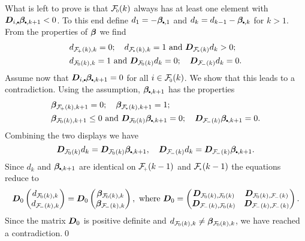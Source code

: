 \begin{subappendices}
What is left to prove is that $\Fset{0}(k)$ always has at least one element
with $\bfD_{i,\sbullet}\bfbeta_{\sbullet,k+1}<0$. To this end define
$d_1=-\bfbeta_{\sbullet,1}$ and $d_k=d_{k-1}-\bfbeta_{\sbullet,k}$ for $k>1$.
From the properties of $\bm{\beta}$ we find
\begin{align*}
 & d_{\Fset{+}(k),k}=0;\quad
 d_{\Fset{*}(k),k}=1\ \text{and}\ \bfD_{\Fset{*}(k)}d_k>0;
 \\ &
 d_{\Fset{0}(k),k}=1\ \text{and}\ \bfD_{\Fset{0}(k)}d_k=0;
 \quad
 \bfD_{\Fset{-}(k)}d_k=0.
\end{align*}
Assume now that $\bfD_{i,\sbullet}\bfbeta_{\sbullet,k+1}=0$ for all
$i\in \Fset{0}(k)$. We show that this leads to a contradiction.
Using the assumption, $\bfbeta_{\sbullet,k+1}$ has the properties
\begin{align*}
 & \bfbeta_{\Fset{+}(k),k+1}=0;\quad
 \bfbeta_{\Fset{*}(k),k+1}=1;
 \\ &
 \bfbeta_{\Fset{0}(k),k+1}\leq 0\ \text{and}\ \bfD_{\Fset{0}(k)}\bfbeta_{\sbullet,k+1}=0;
 \quad
 \bfD_{\Fset{-}(k)}\bfbeta_{\sbullet,k+1}=0.
\end{align*}
Combining the two displays we have
\[
 \bfD_{\Fset{0}(k)}d_k=\bfD_{\Fset{0}(k)}\bfbeta_{\sbullet,k+1},\quad
 \bfD_{\Fset{-}(k)}d_k=\bfD_{\Fset{-}(k)}\bfbeta_{\sbullet,k+1}.
\]
Since $d_k$ and $\bfbeta_{\sbullet,k+1}$ are identical on $\Fset{+}(k-1)$ and
$\Fset{*}(k-1)$ the equations reduce to
\[
 \bfD_0
  \begin{pmatrix}
 d_{\Fset{0}(k),k} \\ d_{\Fset{-}(k),k}
 \end{pmatrix}
 =
 \bfD_0
  \begin{pmatrix}
 \bfbeta_{\Fset{0}(k),k} \\ \bfbeta_{\Fset{-}(k),k}
 \end{pmatrix},
 \ \text{where}\
 \bfD_0=\begin{pmatrix}
 \bfD_{\Fset{0}(k),\Fset{0}(k)} & \bfD_{\Fset{0}(k),\Fset{-}(k)} \\
 \bfD_{\Fset{-}(k),\Fset{0}(k)} & \bfD_{\Fset{-}(k),\Fset{-}(k)}
 \end{pmatrix}.
\]
Since the matrix $\bm{D}_0$ is positive definite and
$d_{\Fset{0}(k),k}\neq \bfbeta_{\Fset{0}(k),k}$, we have reached a contradiction.\qed

\end{subappendices}